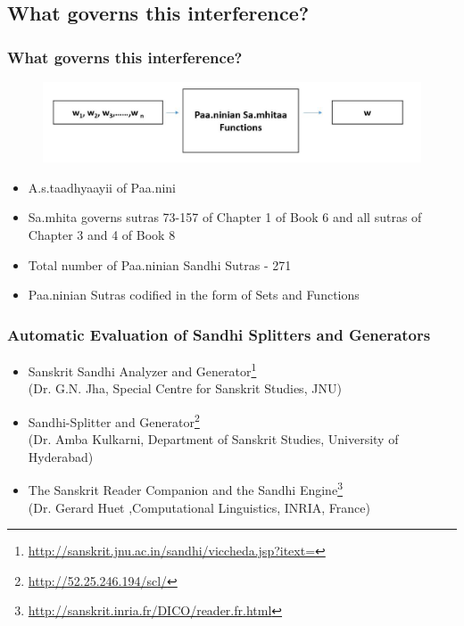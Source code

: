 \documentclass[xcolor=dvipsnames]{beamer}
\begin{document}
\subsection{What governs this interference?}
\begin{frame}
\frametitle{What governs this interference?}
\begin{figure}
	\includegraphics[scale=0.35]{img/panini.png} 
 \end{figure}
\begin{itemize}
\item A.s.taadhyaayii of Paa.nini
\item Sa.mhita governs sutras 73-157 of Chapter 1 of Book 6 and all sutras of Chapter 3 and 4 of Book 8
\item Total number of Paa.ninian Sandhi Sutras - 271
\item Paa.ninian Sutras codified in the form of Sets and Functions

\end{itemize}
\end{frame}

\begin{frame}
\frametitle{Automatic Evaluation of Sandhi Splitters and Generators}
\begin{itemize}
\item Sanskrit Sandhi Analyzer and Generator\footnote{\url{http://sanskrit.jnu.ac.in/sandhi/viccheda.jsp?itext=}}
    \\(Dr. G.N. Jha, Special Centre for Sanskrit Studies, JNU)

\item Sandhi-Splitter and Generator\footnote{\url{http://52.25.246.194/scl/}} 
   \\(Dr. Amba Kulkarni, Department of Sanskrit Studies, University of Hyderabad)

 \item The Sanskrit Reader Companion and the Sandhi Engine\footnote{\url{http://sanskrit.inria.fr/DICO/reader.fr.html}}
    \\(Dr. Gerard Huet ,Computational Linguistics, INRIA, France)

\end{itemize}
\end{frame}
\end{document}

